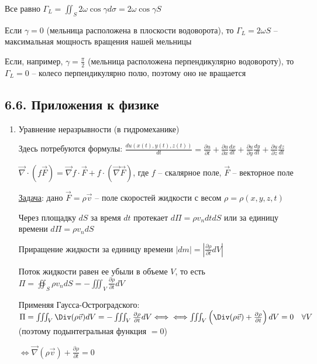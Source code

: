 \documentclass[12pt]{article}
\begin{document}
    Все равно $\Gamma_L = \iint_S 2\omega \cos \gamma d\sigma = 2\omega\cos \gamma S$

    Если $\gamma = 0$ (мельница расположена в плоскости водоворота), то $\Gamma_L = 2\omega S$ -- максимальная мощность вращения нашей мельницы

    Если, например, $\gamma = \frac{\pi}{2}$ (мельница расположена перпендикулярно водовороту), то $\Gamma_L = 0$ -- колесо перпендикулярно полю, поэтому оно не вращается

    \subsection{6.6. Приложения к физике}

    \begin{enumerate}[label*=\arabic** ]
        \item Уравнение неразрывности (в гидромеханике)

        \Nota Здесь потребуются формулы:
        $\frac{du(x(t), y(t), z(t))}{dt} = \frac{\partial u}{\partial t} + \frac{\partial u}{\partial x}\frac{dx}{dt} + \frac{\partial u}{\partial y}\frac{dy}{dt} + \frac{\partial u}{\partial z}\frac{dz}{dt}$

        $\vec\nabla \cdot (f\vec{F}) = \vec\nabla f \cdot \vec{F} + f \cdot (\vec\nabla \vec{F})$, где $f$ -- скалярное поле, $\vec{F}$ -- векторное поле

        \underline{Задача}: дано $\vec{F} = \rho \vec{v}$ -- поле скоростей жидкости с весом $\rho = \rho(x, y, z, t)$

        Через площадку $dS$ за время $dt$ протекает $d\Pi = \rho v_n dt dS$ или за единицу времени $d\Pi = \rho v_n dS$

        Приращение жидкости за единицу времени $|dm| = \left|\frac{\partial \rho}{\partial t} dV\right|$

        Поток жидкости равен ее убыли в объеме $V$, то есть $\Pi = \oiint_S \rho v_n dS = -\iiint_V \frac{\partial \rho}{\partial t} dV$

        Применяя \Ths Гаусса-Остроградского: $\Pi = \iiint_V \Div (\rho \vec{v}) dV = -\iiint_V \frac{\partial \rho}{\partial t} dV \Longleftrightarrow \\
        \Longleftrightarrow \iiint_V \left(\Div (\rho \vec{v}) + \frac{\partial \rho}{\partial t}\right) dV = 0 \quad \forall V$ (поэтому подынтегральная функция $= 0$)

        $\Longleftrightarrow \vec\nabla (\rho \vec{v}) + \frac{\partial \rho}{\partial t} = 0$


\end{enumerate}
\end{document}
